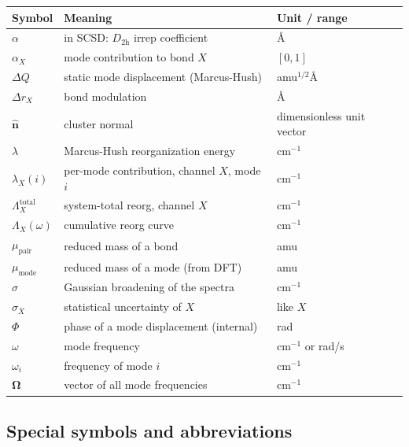 \documentclass[11pt,a4paper,twoside]{article}
\providecommand{\angstrom}{\text{\AA}}    %
\theoremstyle{remark}
\begin{document}
\begin{tabular}{p{1.5cm} p{6cm} p{4cm}}
  \toprule
  \textbf{Symbol} & \textbf{Meaning} & \textbf{Unit / range} \\
  \midrule
  $\alpha$        & in SCSD: $D_\text{2h}$ irrep coefficient & $\angstrom$ \\
  $\alpha_X$      & mode contribution to bond $X$ & $[0, 1]$ \\
  $\Delta Q$      & static mode displacement (Marcus-Hush) & amu$^{1/2}\angstrom$ \\
  $\Delta r_X$    & bond modulation & $\angstrom$ \\
  $\hat{\mathbf{n}}$ & cluster normal & dimensionless unit vector \\
  $\lambda$       & Marcus-Hush reorganization energy & cm$^{-1}$ \\
  $\lambda_X(i)$  & per-mode contribution, channel $X$, mode $i$ & cm$^{-1}$ \\
  $\Lambda_X^\text{total}$ & system-total reorg, channel $X$ & cm$^{-1}$ \\
  $\Lambda_X(\omega)$ & cumulative reorg curve & cm$^{-1}$ \\
  $\mu_\text{pair}$ & reduced mass of a bond & amu \\
  $\mu_\text{mode}$ & reduced mass of a mode (from DFT) & amu \\
  $\sigma$        & Gaussian broadening of the spectra & cm$^{-1}$ \\
  $\sigma_X$      & statistical uncertainty of $X$ & like $X$ \\
  $\Phi$          & phase of a mode displacement (internal) & rad \\
  $\omega$        & mode frequency & cm$^{-1}$ or rad/s \\
  $\omega_i$      & frequency of mode $i$ & cm$^{-1}$ \\
  $\mathbf{\Omega}$ & vector of all mode frequencies & cm$^{-1}$ \\
  \bottomrule
\end{tabular}

\subsection{Special symbols and abbreviations}
\end{document}
